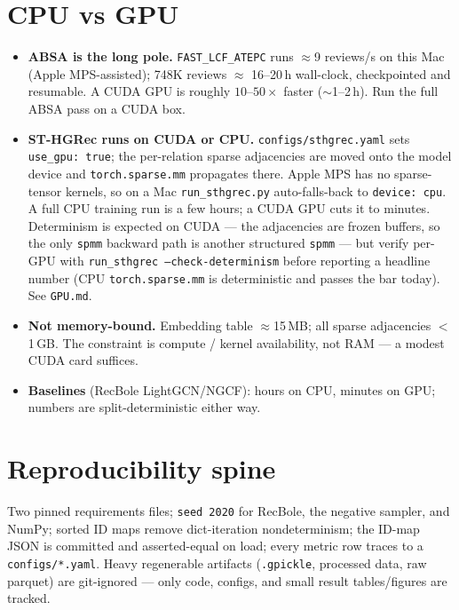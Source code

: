 \documentclass[10pt]{article}
\newenvironment{titems}
  {\begin{itemize}\setlength\itemsep{1.5pt}\setlength\parskip{0pt}\small}
  {\end{itemize}}
\newcommand{\code}[1]{\texttt{\small #1}}
\begin{document}
\section{CPU vs GPU}
\begin{titems}
\item \textbf{ABSA is the long pole.} \code{FAST\_LCF\_ATEPC} runs $\approx$9 reviews/s on
      this Mac (Apple MPS-assisted); 748K reviews $\approx$ 16--20\,h wall-clock,
      checkpointed and resumable. A CUDA GPU is roughly $10$--$50\times$ faster
      ($\sim$1--2\,h). Run the full ABSA pass on a CUDA box.
\item \textbf{ST-HGRec runs on CUDA or CPU.} \code{configs/sthgrec.yaml} sets
      \code{use\_gpu: true}; the per-relation sparse adjacencies are moved onto the model
      device and \code{torch.sparse.mm} propagates there. Apple MPS has no sparse-tensor
      kernels, so on a Mac \code{run\_sthgrec.py} auto-falls-back to \code{device: cpu}.
      A full CPU training run is a few hours; a CUDA GPU cuts it to minutes. Determinism
      is expected on CUDA --- the adjacencies are frozen buffers, so the only \code{spmm}
      backward path is another structured \code{spmm} --- but verify per-GPU with
      \code{run\_sthgrec --check-determinism} before reporting a headline number
      (CPU \code{torch.sparse.mm} is deterministic and passes the bar today). See
      \code{GPU.md}.
\item \textbf{Not memory-bound.} Embedding table $\approx$15\,MB; all sparse adjacencies
      $<$1\,GB. The constraint is compute / kernel availability, not RAM --- a modest CUDA
      card suffices.
\item \textbf{Baselines} (RecBole LightGCN/NGCF): hours on CPU, minutes on GPU; numbers are
      split-deterministic either way.
\end{titems}

\section{Reproducibility spine}
Two pinned requirements files; \code{seed 2020} for RecBole, the negative sampler, and
NumPy; sorted ID maps remove dict-iteration nondeterminism; the ID-map JSON is committed
and asserted-equal on load; every metric row traces to a \code{configs/*.yaml}. Heavy
regenerable artifacts (\code{*.gpickle}, processed data, raw parquet) are git-ignored ---
only code, configs, and small result tables/figures are tracked.
\end{document}
